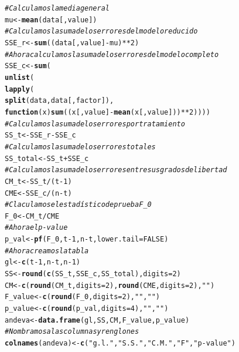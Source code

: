\documentclass[a4paper]{scrartcl}\usepackage[]{graphicx}\usepackage[]{color}
\makeatletter
\newcommand{\hlnum}[1]{\textcolor[rgb]{0.686,0.059,0.569}{#1}}%
\newcommand{\hlstr}[1]{\textcolor[rgb]{0.192,0.494,0.8}{#1}}%
\newcommand{\hlcom}[1]{\textcolor[rgb]{0.678,0.584,0.686}{\textit{#1}}}%
\newcommand{\hlopt}[1]{\textcolor[rgb]{0,0,0}{#1}}%
\newcommand{\hlstd}[1]{\textcolor[rgb]{0.345,0.345,0.345}{#1}}%
\newcommand{\hlkwa}[1]{\textcolor[rgb]{0.161,0.373,0.58}{\textbf{#1}}}%
\newcommand{\hlkwb}[1]{\textcolor[rgb]{0.69,0.353,0.396}{#1}}%
\newcommand{\hlkwc}[1]{\textcolor[rgb]{0.333,0.667,0.333}{#1}}%
\newcommand{\hlkwd}[1]{\textcolor[rgb]{0.737,0.353,0.396}{\textbf{#1}}}%
\newenvironment{kframe}{%
 \def\at@end@of@kframe{}%
 \ifinner\ifhmode%
  \def\at@end@of@kframe{\end{minipage}}%
  \begin{minipage}{\columnwidth}%
 \fi\fi%
 \def\FrameCommand##1{\hskip\@totalleftmargin \hskip-\fboxsep
 \colorbox{shadecolor}{##1}\hskip-\fboxsep
     \hskip-\linewidth \hskip-\@totalleftmargin \hskip\columnwidth}%
 \MakeFramed {\advance\hsize-\width
   \@totalleftmargin\z@ \linewidth\hsize
   \@setminipage}}%
 {\par\unskip\endMakeFramed%
 \at@end@of@kframe}
\newenvironment{knitrout}{}{} %
\makeatother
\begin{document}
\begin{knitrout}
\begin{kframe}
\begin{alltt}
    \hlcom{# Calculamos la media general}
    \hlstd{mu} \hlkwb{<-} \hlkwd{mean}\hlstd{(data[, value])}
    \hlcom{# Calculamos la suma de los errores del modelo reducido}
    \hlstd{SSE_r} \hlkwb{<-} \hlkwd{sum}\hlstd{((data[, value]} \hlopt{-} \hlstd{mu)}\hlopt{**}\hlnum{2}\hlstd{)}
    \hlcom{# Ahora calculamos la suma de los errores del modelo completo}
    \hlstd{SSE_c} \hlkwb{<-} \hlkwd{sum}\hlstd{(}
        \hlkwd{unlist}\hlstd{(}
            \hlkwd{lapply}\hlstd{(}
                \hlkwd{split}\hlstd{(data, data[, factor]),}
                \hlkwa{function}\hlstd{(}\hlkwc{x}\hlstd{)} \hlkwd{sum}\hlstd{((x[, value]} \hlopt{-} \hlkwd{mean}\hlstd{(x[, value]))}\hlopt{**}\hlnum{2}\hlstd{))))}
    \hlcom{# Calculamos la suma de los errores por tratamiento}
    \hlstd{SS_t} \hlkwb{<-} \hlstd{SSE_r} \hlopt{-} \hlstd{SSE_c}
    \hlcom{# Calculamos la suma de los errores totales}
    \hlstd{SS_total} \hlkwb{<-} \hlstd{SS_t} \hlopt{+} \hlstd{SSE_c}
    \hlcom{# Calculamos la suma de los errores entre sus grados de libertad}
    \hlstd{CM_t} \hlkwb{<-} \hlstd{SS_t} \hlopt{/} \hlstd{(t} \hlopt{-} \hlnum{1}\hlstd{)}
    \hlstd{CME} \hlkwb{<-} \hlstd{SSE_c} \hlopt{/} \hlstd{(n} \hlopt{-} \hlstd{t)}
    \hlcom{# Claculamos el estadístico de prueba F_0}
    \hlstd{F_0} \hlkwb{<-} \hlstd{CM_t} \hlopt{/} \hlstd{CME}
    \hlcom{# Ahora el p-value}
    \hlstd{p_val} \hlkwb{<-} \hlkwd{pf}\hlstd{(F_0, t} \hlopt{-} \hlnum{1}\hlstd{, n} \hlopt{-} \hlstd{t,} \hlkwc{lower.tail} \hlstd{=} \hlnum{FALSE}\hlstd{)}
    \hlcom{# Ahora creamos la tabla}
    \hlstd{gl} \hlkwb{<-} \hlkwd{c}\hlstd{(t} \hlopt{-} \hlnum{1}\hlstd{, n} \hlopt{-} \hlstd{t, n} \hlopt{-} \hlnum{1}\hlstd{)}
    \hlstd{SS} \hlkwb{<-} \hlkwd{round}\hlstd{(}\hlkwd{c}\hlstd{(SS_t, SSE_c, SS_total),} \hlkwc{digits} \hlstd{=} \hlnum{2}\hlstd{)}
    \hlstd{CM} \hlkwb{<-} \hlkwd{c}\hlstd{(}\hlkwd{round}\hlstd{(CM_t,} \hlkwc{digits} \hlstd{=} \hlnum{2}\hlstd{),} \hlkwd{round}\hlstd{(CME,} \hlkwc{digits} \hlstd{=} \hlnum{2}\hlstd{),} \hlstr{""}\hlstd{)}
    \hlstd{F_value} \hlkwb{<-} \hlkwd{c}\hlstd{(}\hlkwd{round}\hlstd{(F_0,} \hlkwc{digits} \hlstd{=} \hlnum{2}\hlstd{),} \hlstr{""}\hlstd{,} \hlstr{""}\hlstd{)}
    \hlstd{p_value} \hlkwb{<-} \hlkwd{c}\hlstd{(}\hlkwd{round}\hlstd{(p_val,} \hlkwc{digits} \hlstd{=} \hlnum{4}\hlstd{),} \hlstr{""}\hlstd{,} \hlstr{""}\hlstd{)}
    \hlstd{andeva} \hlkwb{<-} \hlkwd{data.frame}\hlstd{(gl, SS, CM, F_value, p_value)}
    \hlcom{# Nombramos a las columnas y renglones}
    \hlkwd{colnames}\hlstd{(andeva)} \hlkwb{<-} \hlkwd{c}\hlstd{(}\hlstr{"g.l."}\hlstd{,} \hlstr{"S.S."}\hlstd{,} \hlstr{"C.M."}\hlstd{,} \hlstr{"F"}\hlstd{,} \hlstr{"p-value"}\hlstd{)}

\end{alltt}
\end{kframe}
\end{knitrout}
\end{document}
